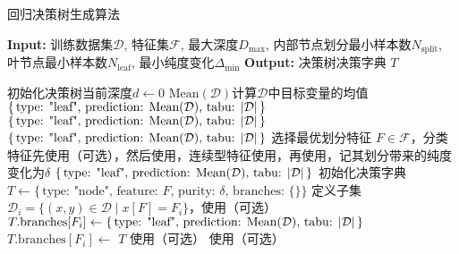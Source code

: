 \begin{algorithm}
	\caption{回归决策树生成算法}
	\begin{algorithmic}[1]
		\State \textbf{Input:}
		训练数据集\(\mathcal{D}\), 
		特征集\(\mathcal{F}\), 
		最大深度\(D_{\max}\), 
		内部节点划分最小样本数\(N_{\text{split}}\), 
		叶节点最小样本数\(N_{\text{leaf}}\), 
		最小纯度变化\(\Delta_{\min}\)
		\State \textbf{Output:} 决策树决策字典 \(T\)
		
		\State 初始化决策树当前深度\(d\gets 0\)
		\State$\text{Mean$(\mathcal{D})$}$计算$\mathcal{D}$中目标变量的均值
		\State \Return \(\{\,\text{type: "leaf", prediction: Mean$(\mathcal{D})$, tabu: $|\mathcal{D}|$\,}\}\)
		\EndIf
		\State \Return \(\{\,\text{type: "leaf", prediction: Mean$(\mathcal{D})$, tabu: $|\mathcal{D}|$\,}\}\)
		\EndIf
		\State \Return \(\{\,\text{type: "leaf", prediction: Mean$(\mathcal{D})$, tabu: $|\mathcal{D}|$\,}\}\)
		\EndIf
		\State 选择最优划分特征 \(F \in \mathcal{F}\)，分类特征先使用（可选），然后使用，连续型特征使用，再使用，记其划分带来的纯度变化为$\delta$
		\If{$\delta$ \(< \Delta_{\min}\)}
		\State \Return \(\{\,\text{type: "leaf", prediction: Mean$(\mathcal{D})$, tabu: $|\mathcal{D}|$\,}\}\)
		\EndIf
		\State 初始化决策字典 \(T \gets \{\,\text{type: "node", feature: } F,\, \text{purity: }\delta,\, \text{branches: \{\}}\}\)
		\State 定义子集 \(\mathcal{D}_i = \{(x,y) \in \mathcal{D} \mid x[F] = F_i\}\)，使用（可选）
		\State \(T.\text{branches}[F_i] \gets \{\,\text{type: "leaf", prediction: Mean$(\mathcal{D})$, tabu: $|\mathcal{D}|$\,}\}\)
		\Else
		\State \(T.\text{branches}[F_i] \gets\) 
		\EndIf
		\EndFor
		\State \Return \(T\)
		\EndFunction
		\State 使用（可选）
		\State 使用（可选）
	\end{algorithmic}
\end{algorithm}


